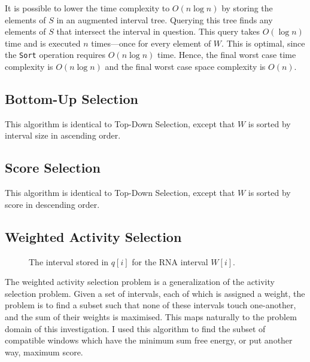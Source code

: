 \documentclass{cshonours}
\begin{document}
It is possible to lower the time complexity to $O(n \log n)$ by storing the elements of $S$ in an augmented interval tree. Querying this tree finds any elements of $S$ that intersect the interval in question. This query takes $O(\log n)$ time and is executed $n$ times---once for every element of $W$. This is optimal, since the \texttt{Sort} operation requires $O(n \log n)$ time. Hence, the final worst case time complexity is $O(n \log n)$ and the final worst case space complexity is $O(n)$.


\subsection{Bottom-Up Selection}
This algorithm is identical to Top-Down Selection, except that $W$ is sorted by interval size in ascending order.

\subsection{Score Selection}
This algorithm is identical to Top-Down Selection, except that $W$ is sorted by score in descending order.


\subsection{Weighted Activity Selection}

\begin{figure}
\begin{center}
\end{center}
\caption{The interval stored in $q[i]$ for the RNA interval $W[i]$.}
\label{fig:rightcompat}
\end{figure}

The weighted activity selection problem is a generalization of the activity selection problem. Given a set of intervals, each of which is assigned a weight, the problem is to find a subset such that none of these intervals touch one-another, and the sum of their weights is maximised. This maps naturally to the problem domain of this investigation. I used this algorithm to find the subset of compatible windows which have the minimum sum free energy, or put another way, maximum score.
\end{document}
